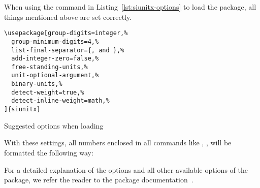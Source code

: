 When using the command in Listing~\ref{lst:siunitx-options} to load the package,
all things mentioned above are set correctly.

\begin{listing}[H]
\begin{verbatim}
\usepackage[group-digits=integer,%
  group-minimum-digits=4,%
  list-final-separator={, and },%
  add-integer-zero=false,%
  free-standing-units,%
  unit-optional-argument,%
  binary-units,%
  detect-weight=true,%
  detect-inline-weight=math,%
]{siunitx}
\end{verbatim}
\caption{Suggested options when loading }
\label{lst:siunitx-options}
\end{listing}

With these settings, all numbers enclosed in all  commands
like \texttt{\num{}}, \texttt{\numlist{}},
\texttt{\SI{}{}} will be formatted the
following way:

For a detailed explanation of the options and all other available options of the
 package, we refer the reader to the package
documentation~\cite{Wright2016}.
